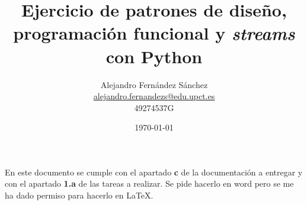 \documentclass{article}
\title{Ejercicio de patrones de diseño, programación funcional y \textit{streams} con Python}
\author{
    Alejandro Fernández Sánchez\\
    \href{mailto:alejandro.fernandezs@edu.upct.es}{alejandro.fernandezs@edu.upct.es}\\
    49274537G
}
\date{\today}
\begin{document}
\pagestyle{fancy}
\setlength{\headheight}{50pt}

\maketitle

En este documento se cumple con el apartado \textbf{c} de la documentación a entregar y con el apartado \textbf{1.a} de las tareas a realizar. Se pide hacerlo en word pero se me ha dado permiso para hacerlo en \LaTeX.







\end{document}
